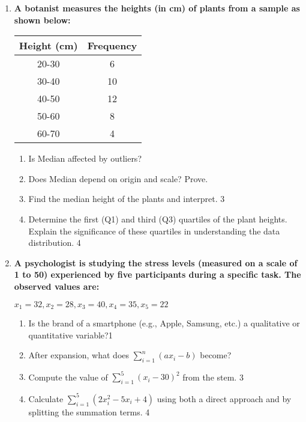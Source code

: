 \documentclass{article}
\begin{document}
\begin{enumerate}
\item
\textbf{A botanist measures the heights (in cm) of plants from a sample as 
shown below:}

\begin{table}[h]
\centering
\begin{tabular}{c|c}
\textbf{Height (cm)} & \textbf{Frequency} \\ \hline
20-30                & 6                  \\ \hline
30-40                & 10                 \\ \hline
40-50                & 12                 \\ \hline
50-60                & 8                  \\ \hline
60-70                & 4                  
\end{tabular}
\end{table}

\begin{enumerate}
\item Is Median affected by outliers?
\item Does Median depend on origin and scale? Prove.
    \item  
    Find the median height of the plants and interpret. \hfill 3
    \item
    Determine the first (Q1) and third (Q3) quartiles of the plant heights. \\
    Explain the significance of these quartiles in understanding the data 
    distribution. \hfill 4
\end{enumerate}

  \item
\textbf{A psychologist is studying the stress levels (measured on a scale 
of 1 to 50) experienced by five participants during a specific task. 
The observed values are:}
\begin{center}
$x_1 = 32, x_2 = 28, x_3 = 40, x_4 = 35, x_5 = 22$
\end{center}
\begin{enumerate}
\item Is the brand of a smartphone (e.g., Apple, Samsung, etc.) a 
qualitative or quantitative variable?\hfill 1
\item After expansion, what does $\displaystyle \sum_{i=1}^n 
\left( ax_i-b \right)$ become?
    \item
    Compute the value of $\displaystyle \sum_{i=1}^5 (x_i - 30)^2$ from the 
    stem. \hfill 3
    \item
    Calculate $\displaystyle \sum_{i=1}^5 (2x_i^2 - 5x_i + 4)$ using both a 
    direct approach and by splitting the summation terms. \hfill 4
\end{enumerate}
 

\end{enumerate}
\end{document}
